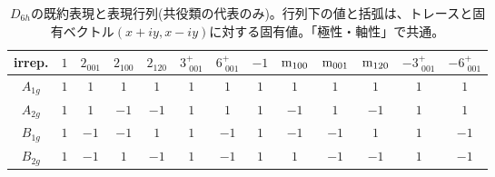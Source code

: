 \documentclass[11pt]{easymemo}
\begin{document}
\begin{landscape}
  \begin{table}
    \tiny
    \caption{$D_{6h}$の既約表現と表現行列(共役類の代表のみ)。行列下の値と括弧は、トレースと固有ベクトル$(x+iy,x-iy)$に対する固有値。「極性・軸性」で共通。
    }
    \label{tbl:7}
    \begin{center}
      \renewcommand{\arraystretch}{2.2}
      \begin{tabular}{ccccccccccccc}
        \hline\hline
        irrep.      & $1$                           & $2{}_{001}$                   & $2{}_{100}$                   & $2{}_{120}$                   & $3^{+}_{\,\,001}$             & $6^{+}_{\,\,001}$             & $-1$                          & $\rm{m}_{100}$                & $\rm{m}_{001}$                & $\rm{m}_{120}$                & $-3^{+}_{\,\,001}$            & $-6^{+}_{\,\,001}$            \\\hline

        $A_{1g}^{}$ & $1$                           & $1$                           & $1$                           & $1$                           & $1$                           & $1$                           & $1$                           & $1$                           & $1$                           & $1$                           & $1$                           & $1$                           \\ \hline

        $A_{2g}^{}$ & $1$                           & $1$                           & $-1$                          & $-1$                          & $1$                           & $1$                           & $1$                           & $-1$                          & $1$                           & $-1$                          & $1$                           & $1$                           \\ \hline

        $B_{1g}^{}$ & $1$                           & $-1$                          & $-1$                          & $1$                           & $1$                           & $-1$                          & $1$                           & $-1$                          & $-1$                          & $1$                           & $1$                           & $-1$                          \\ \hline

        $B_{2g}^{}$ & $1$                           & $-1$                          & $1$                           & $-1$                          & $1$                           & $-1$                          & $1$                           & $1$                           & $-1$                          & $-1$                          & $1$                           & $-1$                          \\ \hline


\end{tabular}
\end{center}
\end{table}
\end{landscape}
\end{document}
